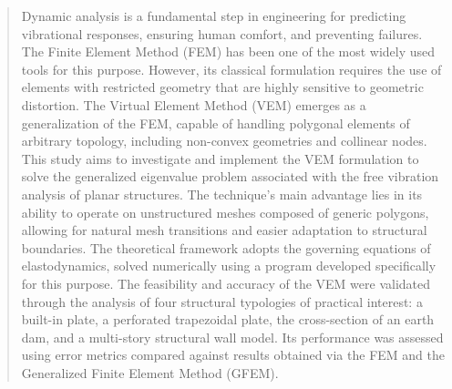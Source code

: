 \begin{abstract}

\noindent Dynamic analysis is a fundamental step in engineering for predicting vibrational responses, ensuring human comfort, and preventing failures. The Finite Element Method (FEM) has been one of the most widely used tools for this purpose. However, its classical formulation requires the use of elements with restricted geometry that are highly sensitive to geometric distortion. The Virtual Element Method (VEM) emerges as a generalization of the FEM, capable of handling polygonal elements of arbitrary topology, including non-convex geometries and collinear nodes. This study aims to investigate and implement the VEM formulation to solve the generalized eigenvalue problem associated with the free vibration analysis of planar structures. The technique's main advantage lies in its ability to operate on unstructured meshes composed of generic polygons, allowing for natural mesh transitions and easier adaptation to structural boundaries. The theoretical framework adopts the governing equations of elastodynamics, solved numerically using a program developed specifically for this purpose. The feasibility and accuracy of the VEM were validated through the analysis of four structural typologies of practical interest: a built-in plate, a perforated trapezoidal plate, the cross-section of an earth dam, and a multi-story structural wall model. Its performance was assessed using error metrics compared against results obtained via the FEM and the Generalized Finite Element Method (GFEM).

\end{abstract}
